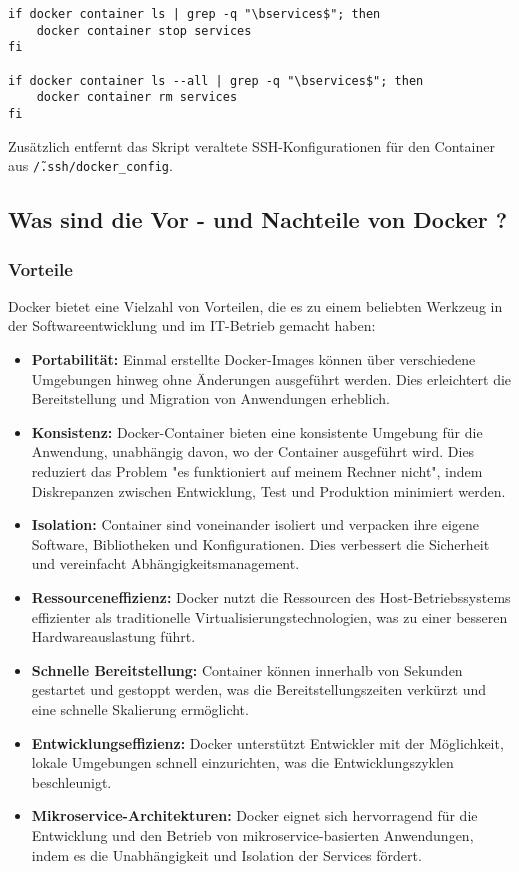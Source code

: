 \begin{verbatim}
if docker container ls | grep -q "\bservices$"; then
    docker container stop services
fi

if docker container ls --all | grep -q "\bservices$"; then
    docker container rm services
fi
\end{verbatim}

Zusätzlich entfernt das Skript veraltete SSH-Konfigurationen für den Container aus \texttt{\~/.ssh/docker\_config}.

\subsection{Was sind die Vor - und Nachteile von Docker ? }

\subsubsection{Vorteile}

Docker bietet eine Vielzahl von Vorteilen, die es zu einem beliebten Werkzeug in der Softwareentwicklung und im IT-Betrieb gemacht haben:

\begin{itemize}
    \item \textbf{Portabilität:} Einmal erstellte Docker-Images können über verschiedene Umgebungen hinweg ohne Änderungen ausgeführt werden. Dies erleichtert die Bereitstellung und Migration von Anwendungen erheblich.
    \item \textbf{Konsistenz:} Docker-Container bieten eine konsistente Umgebung für die Anwendung, unabhängig davon, wo der Container ausgeführt wird. Dies reduziert das Problem "es funktioniert auf meinem Rechner nicht", indem Diskrepanzen zwischen Entwicklung, Test und Produktion minimiert werden.
    \item \textbf{Isolation:} Container sind voneinander isoliert und verpacken ihre eigene Software, Bibliotheken und Konfigurationen. Dies verbessert die Sicherheit und vereinfacht Abhängigkeitsmanagement.
    \item \textbf{Ressourceneffizienz:} Docker nutzt die Ressourcen des Host-Betriebssystems effizienter als traditionelle Virtualisierungstechnologien, was zu einer besseren Hardwareauslastung führt.
    \item \textbf{Schnelle Bereitstellung:} Container können innerhalb von Sekunden gestartet und gestoppt werden, was die Bereitstellungszeiten verkürzt und eine schnelle Skalierung ermöglicht.
    \item \textbf{Entwicklungseffizienz:} Docker unterstützt Entwickler mit der Möglichkeit, lokale Umgebungen schnell einzurichten, was die Entwicklungszyklen beschleunigt.
    \item \textbf{Mikroservice-Architekturen:} Docker eignet sich hervorragend für die Entwicklung und den Betrieb von mikroservice-basierten Anwendungen, indem es die Unabhängigkeit und Isolation der Services fördert.
\end{itemize}

